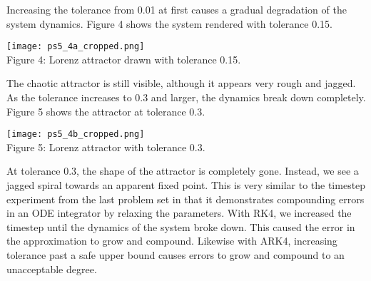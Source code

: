 \documentclass[12pt, letterpaper]{article}
\begin{document}
Increasing the tolerance from 0.01 at first causes a gradual degradation of the 
system dynamics. Figure 4 shows the system rendered with tolerance 0.15. 

\begin{center}
\texttt{[image: ps5\_4a\_cropped.png]}
\\
Figure 4: Lorenz attractor drawn with tolerance 0.15.
\end{center}

The chaotic attractor is still visible, although it appears very rough and 
jagged. As the tolerance increases to 0.3 and larger, the dynamics break down
completely. Figure 5 shows the attractor at tolerance 0.3.

\begin{center}
\texttt{[image: ps5\_4b\_cropped.png]}
\\
Figure 5: Lorenz attractor with tolerance 0.3.
\end{center}

At tolerance 0.3, the shape of the attractor is completely gone. Instead, we see
a jagged spiral towards an apparent fixed point. This is very similar to the 
timestep experiment from the last problem set in that it demonstrates 
compounding errors in an ODE integrator by relaxing the parameters. With RK4, we
increased the timestep until the dynamics of the system broke down. This caused
the error in the approximation to grow and compound. Likewise with ARK4, 
increasing tolerance past a safe upper bound causes errors to grow and compound
to an unacceptable degree.
\end{document}
